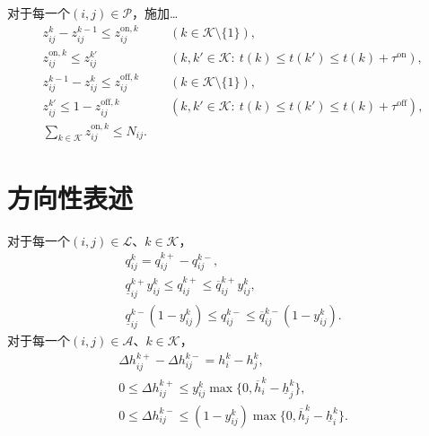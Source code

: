 \documentclass{article}
\begin{document}
对于每一个$(i,j)\in\mathcal P$，施加…
\begin{align}
z_{ij}^k-z_{ij}^{k-1}\le z_{ij}^{\mathrm{on},k}
&\quad(k\in\mathcal K\setminus\{1\}), \tag{13b}\\
z_{ij}^{\mathrm{on},k}\le z_{ij}^{k'}
&\quad(k,k'\in\mathcal K:\ t(k)\le t(k')\le t(k)+\tau^{\mathrm{on}}), \tag{13c}\\
z_{ij}^{k-1}-z_{ij}^k\le z_{ij}^{\mathrm{off},k}
&\quad(k\in\mathcal K\setminus\{1\}), \tag{13d}\\
z_{ij}^{k'}\le1-z_{ij}^{\mathrm{off},k}
&\quad(k,k'\in\mathcal K:\ t(k)\le t(k')\le t(k)+\tau^{\mathrm{off}}), \tag{13e}\\
\sum_{k\in\mathcal K}z_{ij}^{\mathrm{on},k}\le N_{ij}. & \tag{13f}
\end{align}

\section*{方向性表述}
对于每一个$(i,j)\in\mathcal L$、$k\in\mathcal K$，
\begin{align}
q_{ij}^k=q_{ij}^{k+}-q_{ij}^{k-}, \tag{15}\\
\underline q_{ij}^{k+}y_{ij}^k\le q_{ij}^{k+}\le\overline q_{ij}^{k+}y_{ij}^k, \tag{16b}\\
\underline q_{ij}^{k-}(1-y_{ij}^k)\le q_{ij}^{k-}\le\overline q_{ij}^{k-}(1-y_{ij}^k). \tag{16c}
\end{align}
对于每一个$(i,j)\in\mathcal A$、$k\in\mathcal K$，
\begin{align}
\Delta h_{ij}^{k+}-\Delta h_{ij}^{k-}=h_i^k-h_j^k, \tag{17a}\\
0\le\Delta h_{ij}^{k+}\le y_{ij}^k\max\{0,\overline h_i^k-\underline h_j^k\}, \tag{17b}\\
0\le\Delta h_{ij}^{k-}\le(1-y_{ij}^k)\max\{0,\overline h_j^k-\underline h_i^k\}. \tag{17c}
\end{align}
\end{document}
